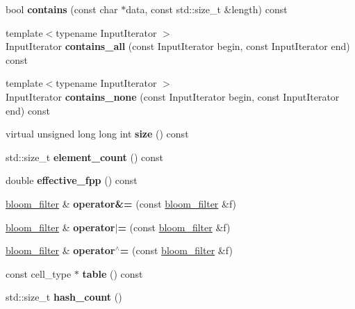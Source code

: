 \begin{DoxyCompactItemize}
bool {\bfseries contains} (const char $\ast$data, const std\+::size\+\_\+t \&length) const
\item 
\mbox{\label{classfc_1_1bloom__filter_a563940aeaaa3889a52b9e78fa18fbed2}} 
{\footnotesize template$<$typename Input\+Iterator $>$ }\\Input\+Iterator {\bfseries contains\+\_\+all} (const Input\+Iterator begin, const Input\+Iterator end) const
\item 
\mbox{\label{classfc_1_1bloom__filter_a4bd29f86037d8faf5caa6dfa5eca7a15}} 
{\footnotesize template$<$typename Input\+Iterator $>$ }\\Input\+Iterator {\bfseries contains\+\_\+none} (const Input\+Iterator begin, const Input\+Iterator end) const
\item 
\mbox{\label{classfc_1_1bloom__filter_a2ce933340ddf63a8c99599d26877d62b}} 
virtual unsigned long long int {\bfseries size} () const
\item 
\mbox{\label{classfc_1_1bloom__filter_a428146893da62df826a82c0114bb1a1f}} 
std\+::size\+\_\+t {\bfseries element\+\_\+count} () const
\item 
\mbox{\label{classfc_1_1bloom__filter_a5aa4a5e6c72746145eea809fb547a697}} 
double {\bfseries effective\+\_\+fpp} () const
\item 
\mbox{\label{classfc_1_1bloom__filter_a0a1558ba9af650018ff2c221bf09f840}} 
\mbox{\hyperlink{classfc_1_1bloom__filter}{bloom\+\_\+filter}} \& {\bfseries operator\&=} (const \mbox{\hyperlink{classfc_1_1bloom__filter}{bloom\+\_\+filter}} \&f)
\item 
\mbox{\label{classfc_1_1bloom__filter_a5814c50d4a7ef4f75289c5e8b187cb62}} 
\mbox{\hyperlink{classfc_1_1bloom__filter}{bloom\+\_\+filter}} \& {\bfseries operator$\vert$=} (const \mbox{\hyperlink{classfc_1_1bloom__filter}{bloom\+\_\+filter}} \&f)
\item 
\mbox{\label{classfc_1_1bloom__filter_a3050a30e8b36af958818961ab826d439}} 
\mbox{\hyperlink{classfc_1_1bloom__filter}{bloom\+\_\+filter}} \& {\bfseries operator$^\wedge$=} (const \mbox{\hyperlink{classfc_1_1bloom__filter}{bloom\+\_\+filter}} \&f)
\item 
\mbox{\label{classfc_1_1bloom__filter_a9887b49deeaa1ccaad2aee40b86dddbd}} 
const cell\+\_\+type $\ast$ {\bfseries table} () const
\item 
\mbox{\label{classfc_1_1bloom__filter_ae07d22fd8cad4d753e4dfd67132c5e7d}} 
std\+::size\+\_\+t {\bfseries hash\+\_\+count} ()
\end{DoxyCompactItemize}

